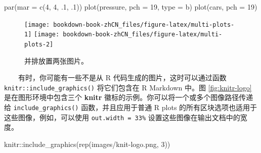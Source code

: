 \documentclass[
  12pt,
]{krantz}
\newenvironment{Shaded}{\begin{snugshade}}{\end{snugshade}}
\newcommand{\AttributeTok}[1]{\textcolor[rgb]{0.77,0.63,0.00}{#1}}
\newcommand{\DecValTok}[1]{\textcolor[rgb]{0.00,0.00,0.81}{#1}}
\newcommand{\FunctionTok}[1]{\textcolor[rgb]{0.00,0.00,0.00}{#1}}
\newcommand{\NormalTok}[1]{#1}
\newcommand{\SpecialCharTok}[1]{\textcolor[rgb]{0.00,0.00,0.00}{#1}}
\newcommand{\StringTok}[1]{\textcolor[rgb]{0.31,0.60,0.02}{#1}}
\theoremstyle{definition}
\theoremstyle{definition}
\theoremstyle{definition}
\theoremstyle{definition}
\theoremstyle{remark}
\begin{document}
\begin{Shaded}
\begin{Highlighting}[]
\FunctionTok{par}\NormalTok{(}\AttributeTok{mar =} \FunctionTok{c}\NormalTok{(}\DecValTok{4}\NormalTok{, }\DecValTok{4}\NormalTok{, .}\DecValTok{1}\NormalTok{, .}\DecValTok{1}\NormalTok{))}
\FunctionTok{plot}\NormalTok{(pressure, }\AttributeTok{pch =} \DecValTok{19}\NormalTok{, }\AttributeTok{type =} \StringTok{\textquotesingle{}b\textquotesingle{}}\NormalTok{)}
\FunctionTok{plot}\NormalTok{(cars, }\AttributeTok{pch =} \DecValTok{19}\NormalTok{)}
\end{Highlighting}
\end{Shaded}

\begin{figure}
\texttt{[image: bookdown-book-zhCN\_files/figure-latex/multi-plots-1]} \texttt{[image: bookdown-book-zhCN\_files/figure-latex/multi-plots-2]} \caption{并排放置两张图片。}\label{fig:multi-plots}
\end{figure}

  有时，你可能有一些不是从 R 代码生成的图片，这时可以通过函数 \texttt{knitr::include\_graphics()} 将它们包含在 R Markdown 中。图 \ref{fig:knitr-logo} 是在图形环境中包含三个 \textbf{knitr} 徽标的示例。你可以将一个或多个图像路径传递给 \texttt{include\_graphics()} 函数，并且应用于普通 R plots 的所有区块选项也适用于这些图像，例如，可以使用 \texttt{out.width\ =\ \textquotesingle{}33\%\textquotesingle{}} 设置这些图像在输出文档中的宽度。

\begin{Shaded}
\begin{Highlighting}[]
\NormalTok{knitr}\SpecialCharTok{::}\FunctionTok{include\_graphics}\NormalTok{(}\FunctionTok{rep}\NormalTok{(}\StringTok{\textquotesingle{}images/knit{-}logo.png\textquotesingle{}}\NormalTok{, }\DecValTok{3}\NormalTok{))}
\end{Highlighting}
\end{Shaded}
\end{document}
